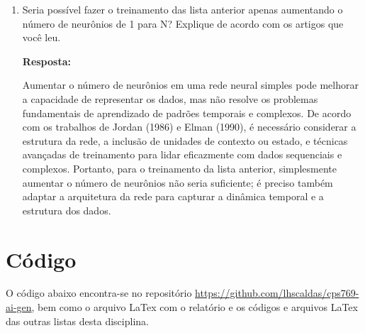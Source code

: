 \documentclass[12 pt]{article}
\begin{document}
\begin{enumerate}
    \item Seria possível fazer o treinamento das lista anterior apenas aumentando o número de neurônios de 1 para N? Explique de acordo com os artigos que você leu.\par

    \textbf{Resposta:} \par

    Aumentar o número de neurônios em uma rede neural simples pode melhorar a capacidade de representar os dados, mas não resolve os problemas fundamentais de aprendizado de padrões temporais e complexos. De acordo com os trabalhos de Jordan (1986) e Elman (1990), é necessário considerar a estrutura da rede, a inclusão de unidades de contexto ou estado, e técnicas avançadas de treinamento para lidar eficazmente com dados sequenciais e complexos. Portanto, para o treinamento da lista anterior, simplesmente aumentar o número de neurônios não seria suficiente; é preciso também adaptar a arquitetura da rede para capturar a dinâmica temporal e a estrutura dos dados.
\end{enumerate}



\section*{Código}

O código abaixo encontra-se no repositório \href{https://github.com/lhscaldas/cps769-ai-gen}{https://github.com/lhscaldas/cps769-ai-gen}, bem como o arquivo LaTex com o relatório e os códigos e arquivos LaTex das outras listas desta disciplina.



\end{document}
